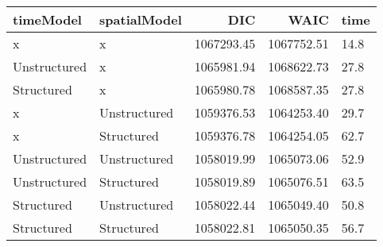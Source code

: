 \begin{table}[ht]
\centering
\begin{tabular}{llrrl}
  \hline
timeModel & spatialModel & DIC & WAIC & time \\ 
  \hline
x & x & 1067293.45 & 1067752.51 & 14.8 \\ 
  Unstructured & x & 1065981.94 & 1068622.73 & 27.8 \\ 
  Structured & x & 1065980.78 & 1068587.35 & 27.8 \\ 
  x & Unstructured & 1059376.53 & 1064253.40 & 29.7 \\ 
  x & Structured & 1059376.78 & 1064254.05 & 62.7 \\ 
  Unstructured & Unstructured & 1058019.99 & 1065073.06 & 52.9 \\ 
  Unstructured & Structured & 1058019.89 & 1065076.51 & 63.5 \\ 
  Structured & Unstructured & 1058022.44 & 1065049.40 & 50.8 \\ 
  Structured & Structured & 1058022.81 & 1065050.35 & 56.7 \\ 
   \hline
\end{tabular}
\end{table}
